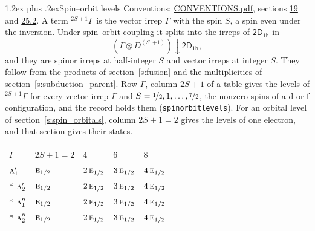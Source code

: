 \documentclass[10pt,a4paper]{article}
\makeatletter
\renewcommand\section{\@startsection{section}{1}{\z@}{-3ex plus -1ex minus -.2ex}%
  {1.2ex plus .2ex}{\normalfont\large\sffamily\bfseries\color{parttitle}}}
\numberwithin{equation}{section}
\newcommand{\grp}[1]{\mathsf{#1}}
\newcommand{\irr}[1]{\text{\normalfont\scshape #1}}
\newcommand{\restr}[2]{#1\!\downarrow#2}
\newcommand{\irrJp}[2]{D^{(#1,#2)}}
\newcommand{\irrprod}{\otimes}
\newcommand{\term}[2]{{}^{#1}#2}
\makeatother
\begin{document}
\section{Spin--orbit levels}\label{s:spin_orbit}
Conventions: \href{../../CONVENTIONS.pdf}{CONVENTIONS.pdf}, sections \href{../../../rotation/CONVENTIONS.pdf\#conv.19}{19} and \href{../../CONVENTIONS.pdf\#conv.25.2}{25.2}.
\leavevmode\label{n:local.spin}\label{n:symbol.term}A term $\term{2S+1}{\Gamma}$ is the vector irrep $\Gamma$ with the spin $S$, a spin even under the inversion. Under spin--orbit coupling it splits into the irreps of $\grp{2D_{1h}}$ in
\begin{equation}\label{e:spinorbit}\restr{(\Gamma \irrprod \irrJp{S}{+1})}{\grp{2D_{1h}}},\end{equation}
and they are spinor irreps at half-integer $S$ and vector irreps at integer $S$. They follow from the products of section~\ref{s:fusion} and the multiplicities of section~\ref{s:subduction_parent}. Row $\Gamma$, column $2S + 1$ of a table gives the levels of $\term{2S+1}{\Gamma}$ for every vector irrep $\Gamma$ and $S = \nicefrac{1}{2}, 1, \dots, \nicefrac{7}{2}$, the nonzero spins of a d or f configuration, and the record holds them (\texttt{spinorbitlevels}). For an orbital level of section~\ref{s:spin_orbitals}, column $2S + 1 = 2$ gives the levels of one electron, and that section gives their states.
{\small\setlength{\tabcolsep}{3pt}\begin{longtable}{@{}lllll@{}}\toprule
$\Gamma$ & $2S + 1 = 2$ & $4$ & $6$ & $8$\\\midrule\endhead
\bottomrule\endfoot\endlastfoot
$\irr{a}_{1}'$ & $\irr{e}_{1/2}$ & $2\,\irr{e}_{1/2}$ & $3\,\irr{e}_{1/2}$ & $4\,\irr{e}_{1/2}$\\*
$\irr{a}_{2}'$ & $\irr{e}_{1/2}$ & $2\,\irr{e}_{1/2}$ & $3\,\irr{e}_{1/2}$ & $4\,\irr{e}_{1/2}$\\*
$\irr{a}_{1}''$ & $\irr{e}_{1/2}$ & $2\,\irr{e}_{1/2}$ & $3\,\irr{e}_{1/2}$ & $4\,\irr{e}_{1/2}$\\*
$\irr{a}_{2}''$ & $\irr{e}_{1/2}$ & $2\,\irr{e}_{1/2}$ & $3\,\irr{e}_{1/2}$ & $4\,\irr{e}_{1/2}$\\
\bottomrule\end{longtable}}
\end{document}
